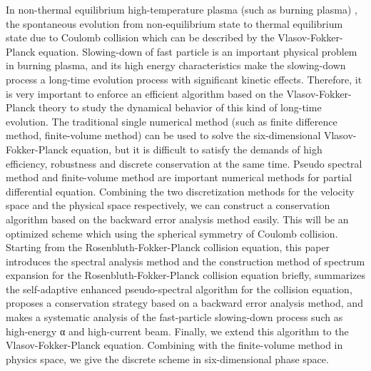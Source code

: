 \begin{abstract*}
  In non-thermal equilibrium high-temperature plasma (such as burning plasma) , the spontaneous evolution from non-equilibrium state to thermal equilibrium state due to Coulomb collision which can be described by the Vlasov-Fokker-Planck equation. Slowing-down of fast particle is an important physical problem in burning plasma, and its high energy characteristics make the slowing-down process a long-time evolution process with significant kinetic effects. Therefore, it is very important to enforce an efficient algorithm based on the Vlasov-Fokker-Planck theory to study the dynamical behavior of this kind of long-time evolution. The traditional single numerical method (such as finite difference method, finite-volume method) can be used to solve the six-dimensional Vlasov-Fokker-Planck equation, but it is difficult to satisfy the demands of high efficiency, robustness and discrete conservation at the same time. Pseudo spectral method and finite-volume method are important numerical methods for partial differential equation. Combining the two discretization methods for the velocity space and the physical space respectively, we can construct a conservation algorithm based on the backward error analysis method easily. This will be an optimized scheme which using the spherical symmetry of Coulomb collision. Starting from the Rosenbluth-Fokker-Planck collision equation, this paper introduces the spectral analysis method and the construction method of spectrum expansion for the Rosenbluth-Fokker-Planck collision equation briefly, summarizes the self-adaptive enhanced pseudo-spectral algorithm for the collision equation, proposes a conservation strategy based on a backward error analysis method, and makes a systematic analysis of the fast-particle slowing-down process such as high-energy α and high-current beam. Finally, we extend this algorithm to the Vlasov-Fokker-Planck equation. Combining with the finite-volume method in physics space, we give the discrete scheme in six-dimensional phase space.
  

\end{abstract*}
